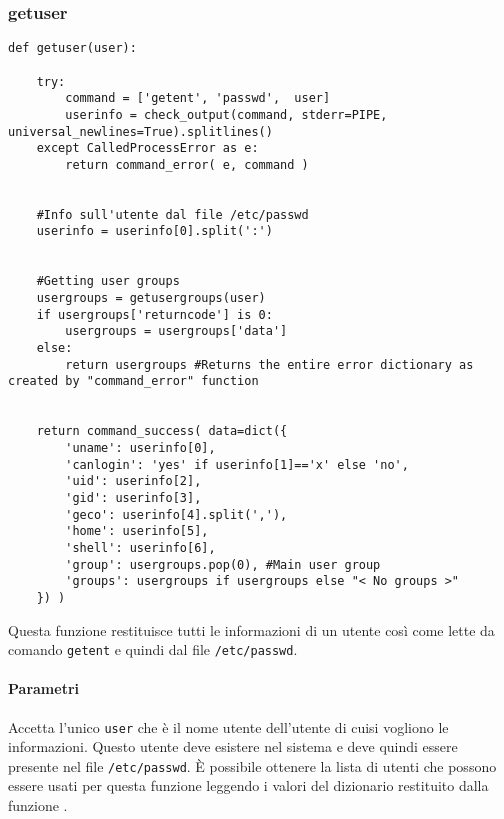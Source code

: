 \documentclass[11pt]{article}
\begin{document}
\subsubsection{getuser}\label{getuser}
\begin{lstlisting}
def getuser(user):

    try:
        command = ['getent', 'passwd',  user]
        userinfo = check_output(command, stderr=PIPE, universal_newlines=True).splitlines()
    except CalledProcessError as e:
        return command_error( e, command )
    

    #Info sull'utente dal file /etc/passwd
    userinfo = userinfo[0].split(':')


    #Getting user groups
    usergroups = getusergroups(user)
    if usergroups['returncode'] is 0:
        usergroups = usergroups['data']
    else:
        return usergroups #Returns the entire error dictionary as created by "command_error" function


    return command_success( data=dict({
    	'uname': userinfo[0],
    	'canlogin': 'yes' if userinfo[1]=='x' else 'no',
    	'uid': userinfo[2],
    	'gid': userinfo[3],
    	'geco': userinfo[4].split(','),
    	'home': userinfo[5],
    	'shell': userinfo[6],
    	'group': usergroups.pop(0), #Main user group
    	'groups': usergroups if usergroups else "< No groups >"
    }) )
\end{lstlisting}
Questa funzione restituisce tutti le informazioni di un utente così come lette da comando \texttt{getent} e quindi dal file \texttt{/etc/passwd}.
\paragraph{Parametri}
Accetta l'unico \texttt{user} che è il nome utente dell'utente di cuisi vogliono le informazioni. Questo utente deve esistere nel sistema e deve
quindi essere presente nel file \texttt{/etc/passwd}. È possibile ottenere la lista di utenti che possono essere usati per questa funzione
leggendo i valori del dizionario restituito dalla funzione .
\end{document}
